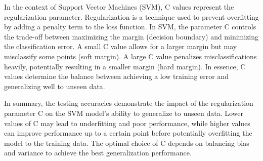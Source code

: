 \documentclass[a4paper,10 pt]{article}
\begin{document}
  \vspace{12pt}

  In the context of Support Vector Machines (SVM), C values represent the regularization parameter. Regularization is a technique used to prevent overfitting by adding a penalty term to the loss function. In SVM, the parameter C controls the trade-off between maximizing the margin (decision boundary) and minimizing the classification error. A small C value allows for a larger margin but may misclassify some points (soft margin). A large C value penalizes misclassifications heavily, potentially resulting in a smaller margin (hard margin). In essence, C values determine the balance between achieving a low training error and generalizing well to unseen data.

  \vspace{12pt}


    In summary, the testing accuracies demonstrate the impact of the regularization parameter C on the SVM model's ability to generalize to unseen data. Lower values of C may lead to underfitting and poor performance, while higher values can improve performance up to a certain point before potentially overfitting the model to the training data. The optimal choice of C depends on balancing bias and variance to achieve the best generalization performance.

  \vspace{12pt}
  
\end{document}
